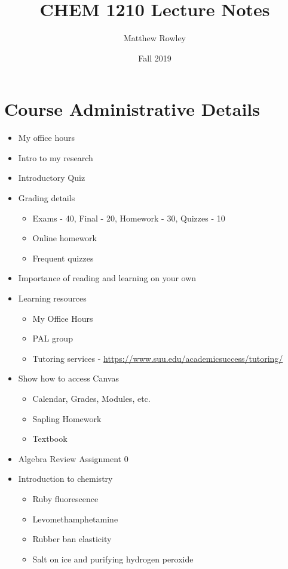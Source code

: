 \documentclass[12pt, openany, letterpaper]{memoir}
\begin{document}
\title{CHEM 1210 Lecture Notes}
\author{Matthew Rowley}
\date{Fall 2019}
\mainmatter
\maketitle
\chapter*{Course Administrative Details}
\begin{itemize}
	\item My office hours
	\item Intro to my research
	\item Introductory Quiz
	\item Grading details
	\begin{itemize}
		\item Exams - 40, Final - 20, Homework - 30, Quizzes - 10
		\item Online homework
		\item Frequent quizzes
	\end{itemize}
	\item Importance of reading and learning on your own
	\item Learning resources
	\begin{itemize}
		\item My Office Hours
		\item PAL group
		\item Tutoring services - \href{https://www.suu.edu/academicsuccess/tutoring/}{https://www.suu.edu/academicsuccess/tutoring/}
	\end{itemize}
	\item Show how to access Canvas
	\begin{itemize}
		\item Calendar, Grades, Modules, etc.
		\item Sapling Homework
		\item Textbook
	\end{itemize}
	\item Algebra Review Assignment 0
	\item Introduction to chemistry
	\begin{itemize}
		\item Ruby fluorescence
		\item Levomethamphetamine
		\item Rubber ban elasticity
		\item Salt on ice and purifying hydrogen peroxide
	\end{itemize}
\end{itemize}
\end{document}
